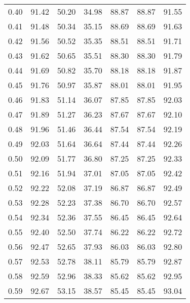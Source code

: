 \begin{tabular}{|c|c|c|c|c|c|c|}
      0.40 &     91.42 &     50.20 &      34.98 &   88.87 &      88.87 &         91.55 \\
      0.41 &     91.48 &     50.34 &      35.15 &   88.69 &      88.69 &         91.63 \\
      0.42 &     91.56 &     50.52 &      35.35 &   88.51 &      88.51 &         91.71 \\
      0.43 &     91.62 &     50.65 &      35.51 &   88.30 &      88.30 &         91.79 \\
      0.44 &     91.69 &     50.82 &      35.70 &   88.18 &      88.18 &         91.87 \\
      0.45 &     91.76 &     50.97 &      35.87 &   88.01 &      88.01 &         91.95 \\
      0.46 &     91.83 &     51.14 &      36.07 &   87.85 &      87.85 &         92.03 \\
      0.47 &     91.89 &     51.27 &      36.23 &   87.67 &      87.67 &         92.10 \\
      0.48 &     91.96 &     51.46 &      36.44 &   87.54 &      87.54 &         92.19 \\
      0.49 &     92.03 &     51.64 &      36.64 &   87.44 &      87.44 &         92.26 \\
      0.50 &     92.09 &     51.77 &      36.80 &   87.25 &      87.25 &         92.33 \\
      0.51 &     92.16 &     51.94 &      37.01 &   87.05 &      87.05 &         92.42 \\
      0.52 &     92.22 &     52.08 &      37.19 &   86.87 &      86.87 &         92.49 \\
      0.53 &     92.28 &     52.23 &      37.38 &   86.70 &      86.70 &         92.57 \\
      0.54 &     92.34 &     52.36 &      37.55 &   86.45 &      86.45 &         92.64 \\
      0.55 &     92.40 &     52.50 &      37.74 &   86.22 &      86.22 &         92.72 \\
      0.56 &     92.47 &     52.65 &      37.93 &   86.03 &      86.03 &         92.80 \\
      0.57 &     92.53 &     52.78 &      38.11 &   85.79 &      85.79 &         92.87 \\
      0.58 &     92.59 &     52.96 &      38.33 &   85.62 &      85.62 &         92.95 \\
      0.59 &     92.67 &     53.15 &      38.57 &   85.45 &      85.45 &         93.04 \\

\end{tabular}
